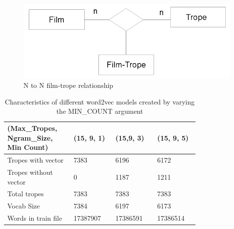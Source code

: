 \documentclass[letterpaper]{article}
\begin{document}
	   \begin{figure}
	\centering
	\includegraphics[width=1\linewidth]{../images/trope-film-n-to-n.png}
	\caption{N to N film-trope relationship}
	\label{fig:film-trope-relationship}
	\end{figure}
	
	
	
	\begin{table}[t]
	\centering
	\begin{tabular}{|p{0.24\linewidth}|p{0.18\linewidth}|p{0.18\linewidth}|p{0.18\linewidth}|}
	\hline
	\textbf{(Max\_Tropes, Ngram\_Size, Min Count)}& \textbf{(15, 9, 1)} & \textbf{(15,9, 3)} & \textbf{(15, 9, 5)}\\
	\hline
	\hline
	Tropes with vector&7383  & 6196 & 6172 \\
	\hline
	Tropes without vector& 0 & 1187 & 1211 \\
	\hline
	Total tropes&7383&7383&7383\\
	\hline
	Vocab Size& 7384 & 6197 & 6173 \\
	\hline
	Words in train file& 17387907 & 17386591 & 17386514 \\
	\hline 
	
	\end{tabular}
	\caption{Characteristics of different word2vec models created by varying the MIN\_COUNT argument}
	\label{tab:variations-with-min-count-argument-15-9}
	\end{table}    
	
\end{document}
